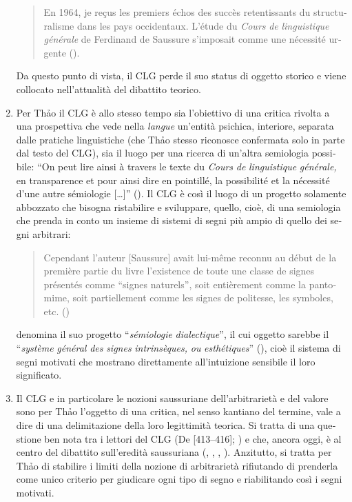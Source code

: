 \documentclass[output=paper]{langsci/langscibook}
\begin{document}
\begin{otherlanguage}{italian}
\begin{enumerate}
\begin{quote} 
En 1964, je reçus les premiers échos des succès retentissants du structuralisme dans les pays occidentaux. L’étude du \textit{Cours} \textit{de} \textit{linguistique} \textit{générale} de Ferdinand de Saussure s’imposait comme une nécessité urgente (\citealt[39]{thao_phenomenologie_1974}).
\end{quote}

Da questo punto di vista, il CLG perde il suo status di oggetto storico e viene collocato nell’attualità del dibattito teorico.

\item Per Th\textlatin{ả}o il CLG è allo stesso tempo sia l’obiettivo di una critica rivolta a una prospettiva che vede nella \textit{langue} un’entità psichica, interiore, separata dalle pratiche linguistiche (che Th\textlatin{ả}o stesso riconosce confermata solo in parte dal testo del CLG), sia il luogo per una ricerca di un’altra semiologia possibile: “On peut lire ainsi à travers le texte du \textit{Cours} \textit{de} \textit{linguistique} \textit{générale,} en transparence et pour ainsi dire en pointillé, la possibilité et la nécessité d’une autre sémiologie […]” (\citealt[40]{thao_phenomenologie_1974}). Il CLG è così il luogo di un progetto solamente abbozzato che bisogna ristabilire e sviluppare, quello, cioè, di una semiologia che prenda in conto un insieme di sistemi di segni più ampio di quello dei segni arbitrari:

\begin{quote}
Cependant l’auteur [Saussure] avait lui-même reconnu au début de la première partie du livre l’existence de toute une classe de signes présentés comme “signes naturels”, soit entièrement comme la pantomime, soit partiellement comme les signes de politesse, les symboles, etc. (\citealt[39]{thao_phenomenologie_1974})
\end{quote}

\citet[42]{thao_phenomenologie_1974} denomina il suo progetto “\textit{sémiologie} \textit{dialectique}”, il cui oggetto sarebbe il “\textit{système} \textit{général} \textit{des} \textit{signes} \textit{intrinsèques,} \textit{ou} \textit{esthétiques}” (\citealt[40]{thao_phenomenologie_1974}), cioè il sistema di segni motivati che mostrano direttamente all’intuizione sensibile il loro significato.

\item Il CLG e in particolare le nozioni saussuriane dell’arbitrarietà e del valore sono per Th\textlatin{ả}o l’oggetto di una critica, nel senso kantiano del termine, vale a dire di una delimitazione della loro legittimità teorica. Si tratta di una questione ben nota tra i lettori del CLG (De \citealt{de_mauro_note_2011}[413--416]; \citealt{sofia_petite_2013}) e che, ancora oggi, è al centro del dibattito sull’eredità saussuriana (\citealt{rastier_valeur_2002}, \citealt{paolucci_identite_2012}, \citealt{laks_phonotactique_2012}, \citealt{coursil_valeurs_2015}). Anzitutto, si tratta per Th\textlatin{ả}o di stabilire i limiti della nozione di arbitrarietà rifiutando di prenderla come unico criterio per giudicare ogni tipo di segno e riabilitando così i segni motivati.


\end{enumerate}
\end{otherlanguage}
\end{document}
